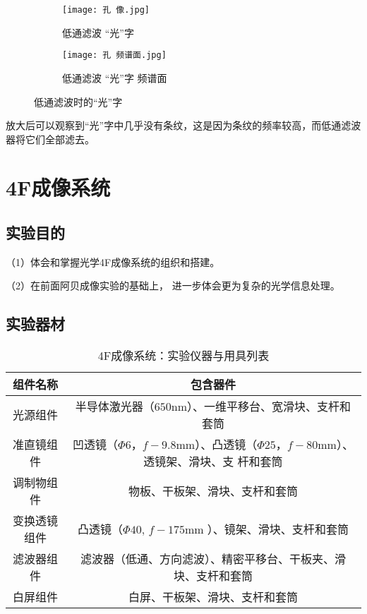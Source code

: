 \documentclass[11pt]{article}
\begin{document}
	\begin{figure}[H]
		\centering
		\begin{subfigure}[t]{0.45\textwidth}  %
			\centering
			\texttt{[image: 孔 像.jpg]}  %
			\caption{低通滤波 “光”字}
		\end{subfigure}
		\begin{subfigure}[t]{0.45\textwidth}  %
			\centering
			\texttt{[image: 孔 频谱面.jpg]}  %
			\caption{低通滤波 “光”字 频谱面}
		\end{subfigure}
		\caption{低通滤波时的“光”字}
		\label{fig:低通滤波_光字}
	\end{figure}
	放大后可以观察到“光”字中几乎没有条纹，这是因为条纹的频率较高，而低通滤波器将它们全部滤去。
	
	
	\section{4F成像系统}
	
	\subsection{实验目的}
	
	（1）体会和掌握光学4F成像系统的组织和搭建。
	
	（2）在前面阿贝成像实验的基础上，
	进一步体会更为复杂的光学信息处理。
	
	\subsection{实验器材}
	
	\begin{table}[H]
		\centering
		\begin{tabular}{cc}\toprule
			组件名称 & 包含器件\\  \midrule
			光源组件& 半导体激光器（$650$nm）、一维平移台、宽滑块、支杆和套筒\\ 
			准直镜组件& 凹透镜（$\Phi 6$，$f-9.8$mm）、凸透镜（$\Phi 25$，$f-80$mm）、透镜架、滑块、支
			杆和套筒\\ 
			调制物组件& 物板、干板架、滑块、支杆和套筒\\
			变换透镜组件& 凸透镜（$\Phi 40$, $f-175$mm ）、镜架、滑块、支杆和套筒\\ 
			滤波器组件& 滤波器（低通、方向滤波）、精密平移台、干板夹、滑块、支杆和套筒\\
			白屏组件& 白屏、干板架、滑块、支杆和套筒\\ 
			\bottomrule
		\end{tabular}
		\caption{4F成像系统：实验仪器与用具列表}
	\end{table}
	
\end{document}
